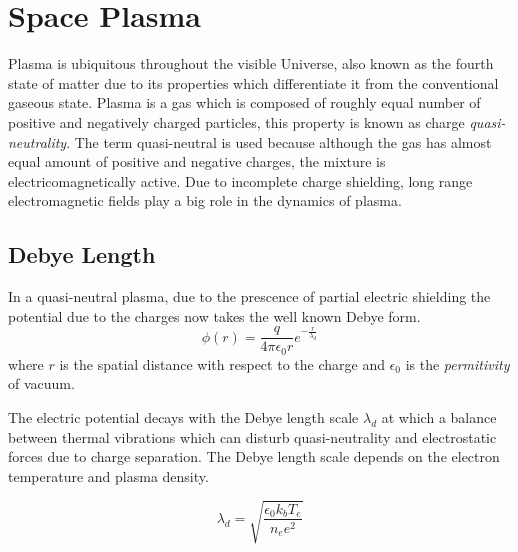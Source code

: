 \section{Space Plasma}\label{sec:plasma}

Plasma is ubiquitous throughout the visible Universe, also known as the fourth state of matter 
due to its properties which differentiate it from the conventional gaseous state. Plasma is a 
gas which is composed of roughly equal number of positive and negatively charged particles, this
property is known as charge \emph{quasi-neutrality}. The term quasi-neutral is used because although
the gas has almost equal amount of positive and negative charges, the mixture is electricomagnetically 
active. Due to incomplete charge shielding, long range electromagnetic fields play a big role in the 
dynamics of plasma.




\subsection*{Debye Length}

In a quasi-neutral plasma, due to the prescence of partial electric shielding the potential due to the charges
now takes the well known Debye form.
\begin{equation}
    \phi(r) = \frac{q}{4\pi\epsilon_0 r} e^{-\frac{r}{\lambda_d}}
\end{equation}
where $r$ is the spatial distance with respect to the charge and $\epsilon_0$ is the \emph{permitivity} of vacuum.


The electric potential decays with the Debye length scale $\lambda_d$ at which a balance between thermal vibrations 
which can disturb quasi-neutrality and electrostatic forces due to charge separation. The Debye length scale depends
on the electron temperature and plasma density.

\begin{equation}\label{eq:debye}
    \lambda_d = \sqrt{\frac{\epsilon_0 k_b T_e}{n_e e^2}}
\end{equation}

